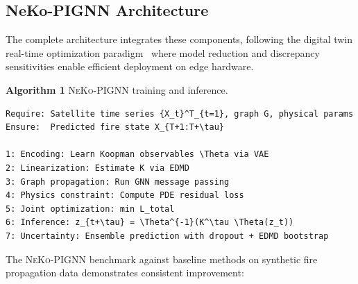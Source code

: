 \documentclass[11pt,twocolumn,a4paper]{article}
\newcommand{\abbrev}[1]{{\small\textsc{#1}}}
\begin{document}
\subsection{NeKo-PIGNN Architecture}

The complete architecture integrates these components, following the digital twin real-time optimization paradigm~\cite{hart2025} where model reduction and discrepancy sensitivities enable efficient deployment on edge hardware.

\medskip
\noindent\textbf{Algorithm 1} \abbrev{NeKo-PIGNN} training and inference.
\label{alg:neko}
\small
\begin{verbatim}
Require: Satellite time series {X_t}^T_{t=1}, graph G, physical params
Ensure:  Predicted fire state X_{T+1:T+\tau}

1: Encoding: Learn Koopman observables \Theta via VAE
2: Linearization: Estimate K via EDMD
3: Graph propagation: Run GNN message passing
4: Physics constraint: Compute PDE residual loss
5: Joint optimization: min L_total
6: Inference: z_{t+\tau} = \Theta^{-1}(K^\tau \Theta(z_t))
7: Uncertainty: Ensemble prediction with dropout + EDMD bootstrap
\end{verbatim}
\medskip

The \abbrev{NeKo-PIGNN} benchmark against baseline methods on synthetic fire propagation data demonstrates consistent improvement:

\begin{table}[htbp]
\centering
\caption{Benchmark comparison---synthetic fire propagation data.}
\label{tab:neko_benchmark}
\small
{}
\end{table}
\end{document}
